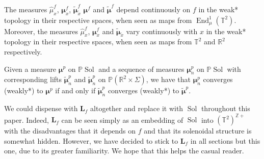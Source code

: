 \documentclass[10pt,a4paper]{amsart}
\newcommand{\Pp}{\mathbb P}
\newcommand{\RR}{\mathbb{R}^2}
\newcommand{\Sol}{\operatorname{Sol}}
\newcommand{\TT}{\mathbb{T}^2}
\newcommand{\Z}{\mathbb{Z}}
\newcommand{\bmu}{\boldsymbol{\mu}}
\newcommand{\hTTf}[1][f]{\mathbf{L}_{#1}}
\newcommand{\hmu}{\hat{\mu}}
\newcommand{\tbmu}{\tilde{\bmu}}
\newcommand{\tx}{\tilde{x}}
\begin{document}
\begin{proposition}\label{prop:a4}
The measures $\hmu_x^f$, $\bmu_x^f$, $\tilde{\bmu}_{\tx}^f$ $\bmu^f$ and $\tilde{\bmu}^f$ depend continuously on $f$ in the weak* topology in their respective spaces, when seen as maps from $\operatorname{End}_\mu^1(\TT)$. Moreover, the measures $\hmu_x^f$, $\bmu_x^f$ and $\tilde{\bmu}_{\tx}$ vary continuously with $x$ in the weak* topology in their respective spaces, when seen as maps from $\TT$ and $\RR$ respectively.
\end{proposition}

 \begin{proposition}\label{convergence_on_projetive_bundles}
Given a measure $\bmu^{p}$ on $\Pp \Sol$ and a sequence of measures $\bmu_n^{p}$ on $\Pp \Sol$ with corresponding lifts $\tbmu_n^{p}$ and $\tbmu_n^{p}$ on $\Pp (\RR \times \Sigma)$, we have that $\bmu_n^{p}$ converges (weakly*) to $\bmu^{p}$ if and only if $\tbmu_n^{p}$ converges (weakly*) to $\tbmu^{p}$. 
 \end{proposition}

\begin{remark}
We could dispense with $\hTTf$ altogether and replace it with $\Sol$ throughout this paper. Indeed, $\hTTf$ can be seen simply as an embedding of $\Sol$ into $(\TT)^{\Z+}$ with the disadvantages that it depends on $f$ and that its solenoidal structure is somewhat hidden. However, we have decided to stick to $\hTTf$ in all sections but this one, due to its greater familiarity. We hope that this helps the casual reader.
\end{remark}
\end{document}
